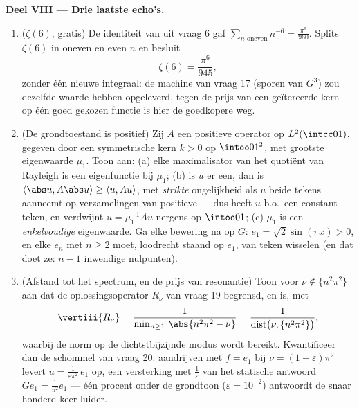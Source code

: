\begin{problem}
\medskip
\noindent\textbf{Deel VIII --- Drie laatste echo's.}
\begin{enumerate}[resume]
  \item ($\zeta(6)$, gratis) De identiteit van  uit vraag
        6 gaf $\sum_{n\text{ oneven}}n^{-6} = \frac{\pi^6}{960}$.
        Splits $\zeta(6)$ in oneven en even $n$ en besluit
        \[
        \zeta(6) = \frac{\pi^6}{945},
        \]
        zonder één nieuwe integraal: de machine van vraag 17
        (sporen van $G^3$) zou dezelfde waarde hebben opgeleverd,
        tegen de prijs van een geïtereerde kern ---  op
        één goed gekozen functie is hier de goedkopere weg.
  \item (De grondtoestand is positief) Zij $A$ een 
         positieve operator op $L^2(\intcc01)$,
        gegeven door een  symmetrische kern $k > 0$ op
        $\intoo01^2$, met grootste eigenwaarde $\mu_1$. Toon aan:
        (a) elke maximalisator van het quotiënt van Rayleigh is
        een eigenfunctie bij $\mu_1$; (b) is $u$ er een, dan is
        $\langle\abs u, A\abs u\rangle \geq \langle u, Au\rangle$,
        met \emph{strikte} ongelijkheid als $u$ beide tekens
        aanneemt op verzamelingen van positieve  --- dus
        heeft $u$ b.o.\ een constant teken, en verdwijnt $u =
        \mu_1^{-1}Au$ nergens op $\intoo01$; (c) $\mu_1$ is een
        \emph{enkelvoudige} eigenwaarde. Ga elke bewering na op
        $G$: $e_1 = \sqrt2\sin(\pi x) > 0$, en elke $e_n$ met $n
        \geq 2$ moet, loodrecht staand op $e_1$, van teken
        wisselen (en dat doet ze: $n - 1$ inwendige nulpunten).
  \item (Afstand tot het spectrum, en de prijs van resonantie)
        Toon voor $\nu \notin \{n^2\pi^2\}$ aan dat de
        oplossingsoperator $R_\nu$ van vraag 19 begrensd,
         en  is, met
        \[
        \vertiii{R_\nu} =
        \frac1{\min_{n\geq1}\,\abs{n^2\pi^2 - \nu}}
        = \frac1{\operatorname{dist}\bigl(\nu,
        \{n^2\pi^2\}\bigr)},
        \]
        waarbij de norm op de dichtstbijzijnde modus wordt
        bereikt. Kwantificeer dan de schommel van vraag 20:
        aandrijven met $f = e_1$ bij $\nu = (1 - \varepsilon)\pi^2$
        levert $u = \frac{1}{\varepsilon\pi^2}\,e_1$ op, een
        versterking met $\frac1\varepsilon$ van het statische
        antwoord $Ge_1 = \frac1{\pi^2}e_1$ --- één procent onder
        de grondtoon ($\varepsilon = 10^{-2}$) antwoordt de snaar
        honderd keer luider.
\end{enumerate}
\end{problem}
